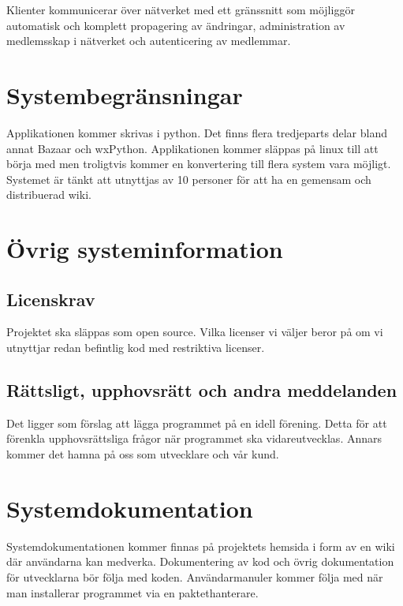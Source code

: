 Klienter kommunicerar över nätverket med ett gränssnitt som möjliggör automatisk och komplett propagering av ändringar, administration av medlemsskap i nätverket och autenticering av medlemmar. 


\section{Systembegränsningar}
Applikationen kommer skrivas i python. Det finns flera tredjeparts delar bland annat Bazaar och wxPython. Applikationen kommer släppas på linux till att börja med men troligtvis kommer en konvertering till flera system vara möjligt. Systemet är tänkt att utnyttjas av 10 personer för att ha en gemensam och distribuerad wiki.

\section{Övrig systeminformation} %

\subsection{Licenskrav}
Projektet ska släppas som open source. Vilka licenser vi väljer beror på om vi utnyttjar redan befintlig kod med restriktiva licenser.

\subsection{Rättsligt, upphovsrätt och andra meddelanden}
Det ligger som förslag att lägga programmet på en idell förening. Detta för att förenkla upphovsrättsliga frågor när programmet ska vidareutvecklas. Annars kommer det hamna på oss som utvecklare och vår kund. 


\section{Systemdokumentation}
Systemdokumentationen kommer finnas på projektets hemsida i form av en wiki där användarna kan medverka. Dokumentering av kod och övrig dokumentation för utvecklarna bör följa med koden. Användarmanuler kommer följa med när man installerar programmet via en paktethanterare. %


